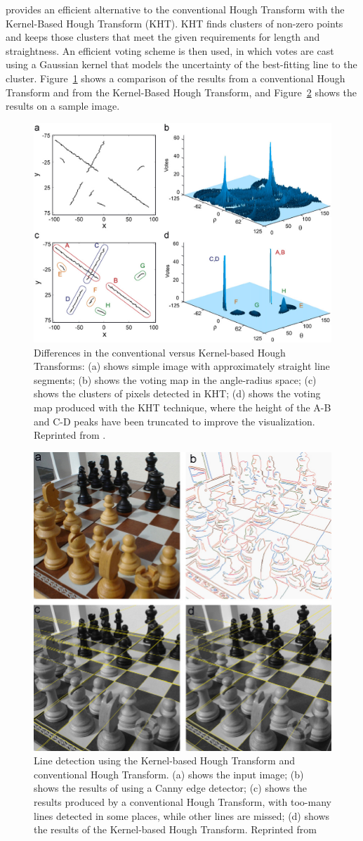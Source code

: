 \documentclass[DM,authoryear,toc]{lsstdoc}
\begin{document}
\cite{fernandes:2008} provides an efficient alternative to the conventional Hough Transform with the Kernel-Based Hough Transform (KHT). KHT finds clusters of non-zero points and keeps those clusters that meet the given requirements for length and straightness. An efficient voting scheme is then used, in which votes are cast using a Gaussian kernel that models the uncertainty of the best-fitting line to the cluster. Figure~\ref{fig: hough demo} shows a comparison of the results from a conventional Hough Transform and from the Kernel-Based Hough Transform, and Figure~\ref{fig: hough results} shows the results on a sample image.
\begin{figure}
\centering
\includegraphics[width=0.5\columnwidth]{figures/hough_voting_demo.jpg}
\caption{Differences in the conventional versus Kernel-based Hough Transforms: (a) shows simple image with approximately straight line segments; (b) shows the voting map in the angle-radius space; (c) shows the clusters of pixels detected in KHT; (d) shows the voting map produced with the KHT technique, where the height of the A-B and C-D peaks have been truncated to improve the visualization. Reprinted from \cite{fernandes:2008}.}
\label{fig: hough demo}
\end{figure}
\begin{figure}
\centering
\includegraphics[width=0.5\columnwidth]{figures/hough_line_identification.jpg}
\caption{Line detection using the Kernel-based Hough Transform and conventional Hough Transform. (a) shows the input image; (b) shows the results of using a Canny edge detector; (c) shows the results produced by a conventional Hough Transform, with too-many lines detected in some places, while other lines are missed; (d) shows the results of the Kernel-based Hough Transform. Reprinted from \cite{fernandes:2008}}
\label{fig: hough results}
\end{figure}
\end{document}
